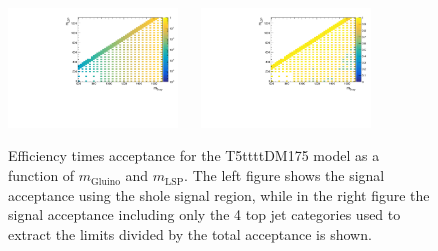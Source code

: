 \begin{figure}[h!]
  \begin{center}
    \includegraphics[width=0.4\textwidth]{figures/jetRanking/T5ttttDM175/eff/T5ttttDM175_merging_9_cats.pdf} ~~
    \includegraphics[width=0.4\textwidth]{figures/susyResults/T5ttttDM175_doubleRatioAcceptance.pdf} \\
    \caption{
      Efficiency times acceptance for the T5ttttDM175 model as a function of $m_{\mathrm{Gluino}}$ and $m_{\mathrm{LSP}}$.
      The left figure shows the signal acceptance using the shole signal region, 
      while in the right figure the signal acceptance including only the 4 top jet categories used to extract the limits divided by the total acceptance is shown.
    }
    \label{fig:sig-eff-T5ttttDM175}
  \end{center}
\end{figure}

